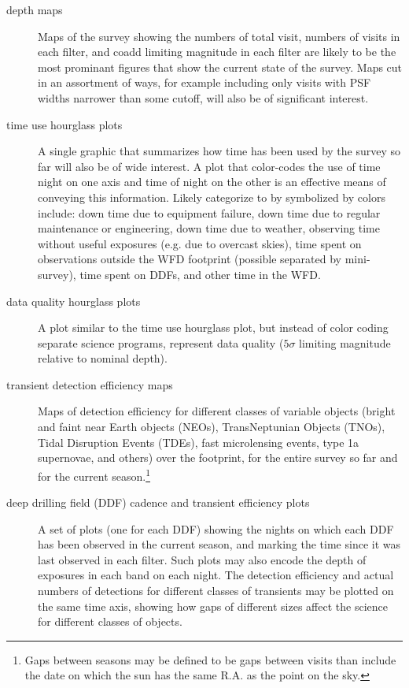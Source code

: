 \begin{description}
\item[{depth maps}] Maps of the survey showing the numbers of total visit, numbers of visits in each filter, and coadd limiting magnitude in each filter are likely to be the most prominant figures that show the current state of the survey. Maps cut in an assortment of ways, for example including only visits with PSF widths narrower than some cutoff, will also be of significant interest.
\item[{time use hourglass plots}] A single graphic that summarizes how time has been used by the survey so far will also be of wide interest. A plot that color-codes the use of time night on one axis and time of night on the other is an effective means of conveying this information. Likely categorize to by symbolized by colors include: down time due to equipment failure, down time due to regular maintenance or engineering, down time due to weather, observing time without useful exposures (e.g. due to overcast skies), time spent on observations outside the WFD footprint (possible separated by mini-survey), time spent on DDFs, and other time in the WFD.
\item[{data quality hourglass plots}] A plot similar to the time use hourglass plot, but instead of color coding separate science programs, represent data quality (\(5\sigma\) limiting magnitude relative to nominal depth).
\item[{transient detection efficiency maps}] Maps of detection efficiency for different classes of variable objects (bright and faint near Earth objects (NEOs), TransNeptunian Objects (TNOs), Tidal Disruption Events (TDEs), fast microlensing events, type 1a supernovae, and others) over the footprint, for the entire survey so far and for the current season.\footnote{Gaps between seasons may be defined to be gaps between visits than include the date on which the sun has the same R.A. as the point on the sky.}
\item[{deep drilling field (DDF) cadence and transient efficiency plots}] A set of plots (one for each DDF) showing the nights on which each DDF has been observed in the current season, and marking the time since it was last observed in each filter. Such plots may also encode the depth of exposures in each band on each night. The detection efficiency and actual numbers of detections for different classes of transients may be plotted on the same time axis, showing how gaps of different sizes affect the science for different classes of objects.
\end{description}

